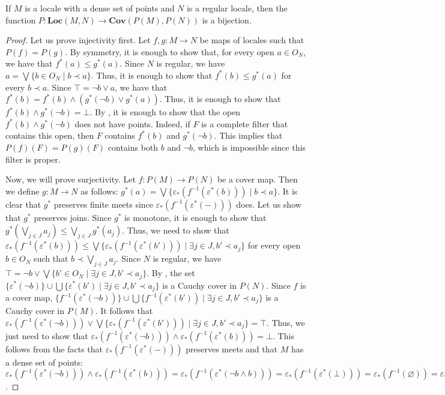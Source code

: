 \documentclass[reqno]{amsart}
\theoremstyle{definition}
\theoremstyle{remark}
\numberwithin{figure}{section}
\newcommand{\rb}{\prec}
\newcommand{\cat}[1]{\mathbf{#1}}
\begin{document}
\begin{prop}[locale-ff]
If $M$ is a locale with a dense set of points and $N$ is a regular locale, then the function $P : \cat{Loc}(M,N) \to \cat{Cov}(P(M),P(N))$ is a bijection.
\end{prop}
\begin{proof}
Let us prove injectivity first.
Let $f,g : M \to N$ be maps of locales such that $P(f) = P(g)$.
By symmetry, it is enough to show that, for every open $a \in O_N$, we have that $f^*(a) \leq g^*(a)$.
Since $N$ is regular, we have $a = \bigvee \{ b \in O_N \mid b \rb a \}$.
Thus, it is enough to show that $f^*(b) \leq g^*(a)$ for every $b \rb a$.
Since $\top = \neg b \vee a$, we have that $f^*(b) = f^*(b) \wedge (g^*(\neg b) \vee g^*(a))$.
Thus, it is enough to show that $f^*(b) \wedge g^*(\neg b) = \bot$.
By , it is enough to show that the open $f^*(b) \wedge g^*(\neg b)$ does not have points.
Indeed, if $F$ is a complete filter that contains this open, then $F$ contains $f^*(b)$ and $g^*(\neg b)$.
This implies that $P(f)(F) = P(g)(F)$ contains both $b$ and $\neg b$, which is impossible since this filter is proper.

Now, we will prove surjectivity.
Let $f : P(M) \to P(N)$ be a cover map.
Then we define $g : M \to N$ as follows: $g^*(a) = \bigvee \{ \varepsilon_*(f^{-1}(\varepsilon^*(b))) \mid b \rb a \}$.
It is clear that $g^*$ preserves finite meets since $\varepsilon_*(f^{-1}(\varepsilon^*(-)))$ does.
Let us show that $g^*$ preserves joins.
Since $g^*$ is monotone, it is enough to show that $g^*(\bigvee_{j \in J} a_j) \leq \bigvee_{j \in J} g^*(a_j)$.
Thus, we need to show that $\varepsilon_*(f^{-1}(\varepsilon^*(b))) \leq \bigvee \{ \varepsilon_*(f^{-1}(\varepsilon^*(b'))) \mid \exists j \in J, b' \rb a_j \}$ for every open $b \in O_N$ such that $b \rb \bigvee_{j \in J} a_j$.
Since $N$ is regular, we have $\top = \neg b \vee \bigvee \{ b' \in O_N \mid \exists j \in J, b' \rb a_j \}$.
By , the set $\{ \varepsilon^*(\neg b) \} \cup \bigcup \{ \varepsilon^*(b') \mid \exists j \in J, b' \rb a_j \}$ is a Cauchy cover in $P(N)$.
Since $f$ is a cover map, $\{ f^{-1}(\varepsilon^*(\neg b)) \} \cup \bigcup \{ f^{-1}(\varepsilon^*(b')) \mid \exists j \in J, b' \rb a_j \}$ is a Cauchy cover in $P(M)$.
It follows that $\varepsilon_*(f^{-1}(\varepsilon^*(\neg b))) \vee \bigvee \{ \varepsilon_*(f^{-1}(\varepsilon^*(b'))) \mid \exists j \in J, b' \rb a_j \} = \top$.
Thus, we just need to show that $\varepsilon_*(f^{-1}(\varepsilon^*(\neg b))) \wedge \varepsilon_*(f^{-1}(\varepsilon^*(b))) = \bot$.
This follows from the facts that $\varepsilon_*(f^{-1}(\varepsilon^*(-)))$ preserves meets and that $M$ has a dense set of points: $\varepsilon_*(f^{-1}(\varepsilon^*(\neg b))) \wedge \varepsilon_*(f^{-1}(\varepsilon^*(b))) = \varepsilon_*(f^{-1}(\varepsilon^*(\neg b \wedge b))) = \varepsilon_*(f^{-1}(\varepsilon^*(\bot))) = \varepsilon_*(f^{-1}(\varnothing)) = \varepsilon_*(\varnothing) = \bot$.


\end{proof}
\end{document}
